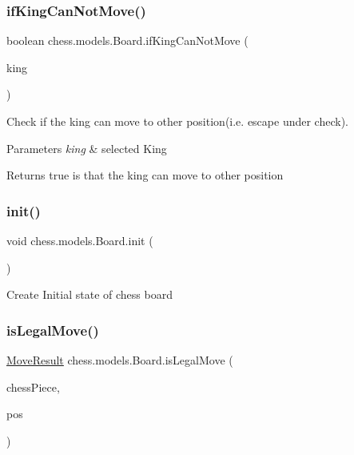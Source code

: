 \subsubsection{\texorpdfstring{if\+King\+Can\+Not\+Move()}{ifKingCanNotMove()}}
{\footnotesize\ttfamily boolean chess.\+models.\+Board.\+if\+King\+Can\+Not\+Move (\begin{DoxyParamCaption}\item[{\mbox{\hyperlink{classchess_1_1models_1_1_chess_piece}{Chess\+Piece}}}]{king }\end{DoxyParamCaption})\hspace{0.3cm}{\ttfamily [private]}}

Check if the king can move to other position(i.\+e. escape under check).


\begin{DoxyParams}{Parameters}
{\em king} & selected King \\
\hline
\end{DoxyParams}
\begin{DoxyReturn}{Returns}
true is that the king can move to other position 
\end{DoxyReturn}
\mbox{\label{classchess_1_1models_1_1_board_a63ff29b16684420475c594d5dc11f24a}} 
\subsubsection{\texorpdfstring{init()}{init()}}
{\footnotesize\ttfamily void chess.\+models.\+Board.\+init (\begin{DoxyParamCaption}{ }\end{DoxyParamCaption})\hspace{0.3cm}{\ttfamily [private]}}

Create Initial state of chess board \mbox{\label{classchess_1_1models_1_1_board_a2514b6b830efc0aeeb2ba6f64aa033e2}} 
\subsubsection{\texorpdfstring{is\+Legal\+Move()}{isLegalMove()}}
{\footnotesize\ttfamily \mbox{\hyperlink{enumchess_1_1models_1_1enums_1_1_move_result}{Move\+Result}} chess.\+models.\+Board.\+is\+Legal\+Move (\begin{DoxyParamCaption}\item[{\mbox{\hyperlink{classchess_1_1models_1_1_chess_piece}{Chess\+Piece}}}]{chess\+Piece,  }\item[{\mbox{\hyperlink{classchess_1_1models_1_1_position}{Position}}}]{pos }\end{DoxyParamCaption})}

